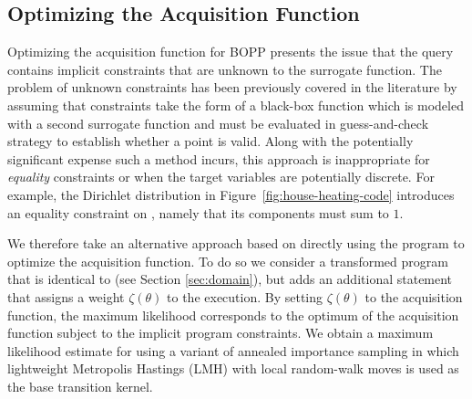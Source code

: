 
\subsection{Optimizing the Acquisition Function}
\label{sec:optacqfunc}

Optimizing the acquisition function for BOPP presents the issue that the query contains implicit constraints that are unknown to the surrogate function.  The problem of unknown constraints has been previously covered in the literature \citep{gardner2014bayesian,hernandez2015general} by assuming that constraints take the form of a black-box function which is modeled with a second surrogate function and must be evaluated in guess-and-check strategy to establish whether a point is valid. Along with the potentially significant expense such a method incurs, this approach is inappropriate for \emph{equality} constraints or when the target variables are potentially discrete.  For example, the Dirichlet distribution in Figure~\ref{fig:house-heating-code} introduces an equality constraint on , namely that its components must sum to $1$.

We therefore take an alternative approach based on directly using the program to optimize the acquisition function.  To do so we consider a transformed program  that is identical to  (see Section \ref{sec:domain}), but adds an additional \observe statement that assigns a weight $\zeta(\theta)$ to the execution.  By setting $\zeta(\theta)$ to the acquisition function, the maximum likelihood corresponds to the optimum of the acquisition function subject to the implicit program constraints.  %
We obtain a maximum likelihood estimate for  using a variant of annealed importance sampling \citep{neal2001annealed} in which lightweight Metropolis Hastings (LMH) \citep{wingate2011lightweight} with local random-walk moves is used as the base transition kernel. %

